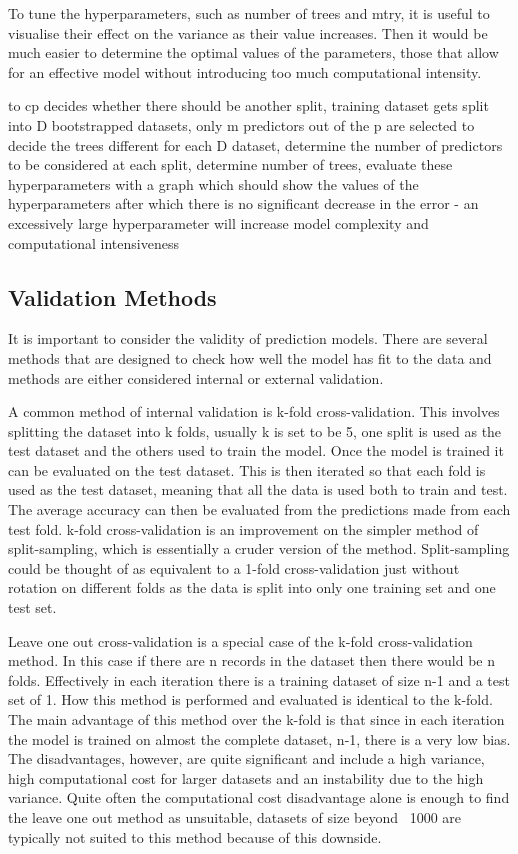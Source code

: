 \documentclass[11pt]{article}
\begin{document}
To tune the hyperparameters, such as number of trees and mtry, it is useful to visualise their effect on the variance as their value increases. Then it would be much easier to determine the optimal values of the parameters, those that allow for an effective model without introducing too much computational intensity.

 to cp decides whether there should be another split, training dataset gets split into D bootstrapped datasets, only m predictors out of the p are selected to decide the trees different for each D dataset, determine the number of predictors to be considered at each split, determine number of trees, evaluate these hyperparameters with a graph which should show the values of the hyperparameters after which there is no significant decrease in the error - an excessively large hyperparameter will increase model complexity and computational intensiveness

\subsection{Validation Methods}
It is important to consider the validity of prediction models. There are several methods that are designed to check how well the model has fit to the data and methods are either considered internal or external validation. 

A common method of internal validation is k-fold cross-validation. This involves splitting the dataset into k folds, usually k is set to be 5, one split is used as the test dataset and the others used to train the model. Once the model is trained it can be evaluated on the test dataset. This is then iterated so that each fold is used as the test dataset, meaning that all the data is used both to train and test. The average accuracy can then be evaluated from the predictions made from each test fold. k-fold cross-validation is an improvement on the simpler method of split-sampling, which is essentially a cruder version of the method. Split-sampling could be thought of as equivalent to a 1-fold cross-validation just without rotation on different folds as the data is split into only one training set and one test set.

Leave one out cross-validation is a special case of the k-fold cross-validation method. In this case if there are n records in the dataset then there would be n folds. Effectively in each iteration there is a training dataset of size n-1 and a test set of 1. How this method is performed and evaluated is identical to the k-fold. The main advantage of this method over the k-fold is that since in each iteration the model is trained on almost the complete dataset, n-1, there is a very low bias. The disadvantages, however, are quite significant and include a high variance, high computational cost for larger datasets and an instability due to the high variance. Quite often the computational cost disadvantage alone is enough to find the leave one out method as unsuitable, datasets of size beyond ~1000 are typically not suited to this method because of this downside.
\end{document}
